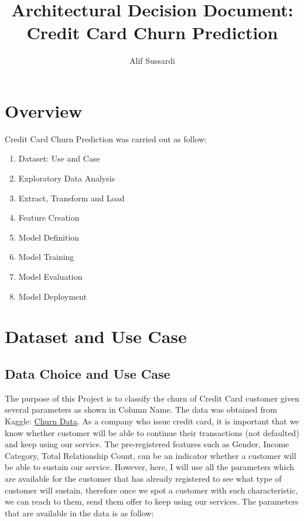 \documentclass{homeworg}
\title{Architectural Decision Document:\\\textbf{Credit Card Churn Prediction}}
\author{Alif Sussardi}
\begin{document}
\graphicspath{ {./figure/} }
\maketitle

\section{Overview}
Credit Card Churn Prediction was carried out as follow:
\begin{enumerate}
    \item Dataset: Use and Case
    \item Exploratory Data Analysis
    \item Extract, Transform and Load
    \item Feature Creation
    \item Model Definition
    \item Model Training
    \item Model Evaluation
    \item Model Deployment
\end{enumerate}

\section{Dataset and Use Case}
\subsection{Data Choice and Use Case}
The purpose of this Project is to classify the churn of Credit Card customer given several parameters as shown in Column Name.
The data was obtained from Kaggle: \href{https://www.kaggle.com/sakshigoyal7/credit-card-customers}{Churn Data}.
As a company who issue credit card, it is important that we know whether customer will be able to continue their transactions (not defaulted) and keep using our service. The pre-registered features such as Gender, Income Category, Total Relationship Count, can be an indicator whether a customer will be able to sustain our service. 
However, here, I will use all the parameters which are available for the customer that has already registered to see what type of customer will sustain, therefore once we spot a customer with such characteristic, we can reach to them, send them offer to keep using our services.
The parameters that are available in the data is as follow:
\end{document}
